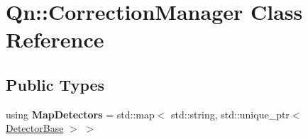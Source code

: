\hypertarget{classQn_1_1CorrectionManager}{}\section{Qn\+:\+:Correction\+Manager Class Reference}
\label{classQn_1_1CorrectionManager}
\subsection*{Public Types}
\begin{DoxyCompactItemize}
\item 
\mbox{\label{classQn_1_1CorrectionManager_ae3efe5c5668bf7050b909a49ced526d5}} 
using {\bfseries Map\+Detectors} = std\+::map$<$ std\+::string, std\+::unique\+\_\+ptr$<$ \mbox{\hyperlink{classQn_1_1DetectorBase}{Detector\+Base}} $>$ $>$
\end{DoxyCompactItemize}
